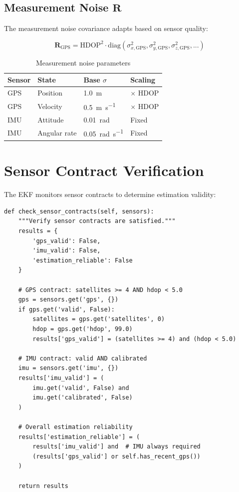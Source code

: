 \subsection{Measurement Noise $\mathbf{R}$}

The measurement noise covariance adapts based on sensor quality:

\begin{equation}
    \mathbf{R}_{\text{GPS}} = \text{HDOP}^2 \cdot \text{diag}(\sigma_{x,\text{GPS}}^2, \sigma_{y,\text{GPS}}^2, \sigma_{z,\text{GPS}}^2, ...)
\end{equation}

\begin{table}[htbp]
    \centering
    \caption{Measurement noise parameters}
    \label{tab:measurement_noise}
    \begin{tabular}{@{}llll@{}}
        \toprule
        \textbf{Sensor} & \textbf{State} & \textbf{Base $\sigma$} & \textbf{Scaling} \\
        \midrule
        GPS & Position & \SI{1.0}{\meter} & $\times$ HDOP \\
        GPS & Velocity & \SI{0.5}{\meter\per\second} & $\times$ HDOP \\
        IMU & Attitude & \SI{0.01}{\radian} & Fixed \\
        IMU & Angular rate & \SI{0.05}{\radian\per\second} & Fixed \\
        \bottomrule
    \end{tabular}
\end{table}

\section{Sensor Contract Verification}

The EKF monitors sensor contracts to determine estimation validity:

\begin{lstlisting}[caption={Sensor contract checking}]
def check_sensor_contracts(self, sensors):
    """Verify sensor contracts are satisfied."""
    results = {
        'gps_valid': False,
        'imu_valid': False,
        'estimation_reliable': False
    }

    # GPS contract: satellites >= 4 AND hdop < 5.0
    gps = sensors.get('gps', {})
    if gps.get('valid', False):
        satellites = gps.get('satellites', 0)
        hdop = gps.get('hdop', 99.0)
        results['gps_valid'] = (satellites >= 4) and (hdop < 5.0)

    # IMU contract: valid AND calibrated
    imu = sensors.get('imu', {})
    results['imu_valid'] = (
        imu.get('valid', False) and
        imu.get('calibrated', False)
    )

    # Overall estimation reliability
    results['estimation_reliable'] = (
        results['imu_valid'] and  # IMU always required
        (results['gps_valid'] or self.has_recent_gps())
    )

    return results
\end{lstlisting}

